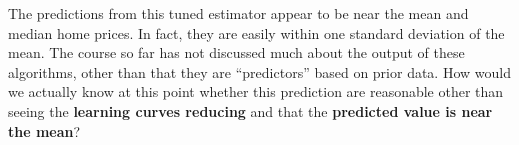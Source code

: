 \documentclass[12pt,letterpaper]{article}
\begin{document}
The predictions from this tuned estimator appear to be near the mean and median home prices. In fact, they are easily within one standard deviation of the mean.
The course so far has not discussed much about the output of these algorithms, other than that they are ``predictors'' based on prior data. 
How would we actually know at this point whether this prediction are reasonable other than seeing the {\bf learning curves reducing} and that the {\bf predicted value is near the mean}?
\end{document}
